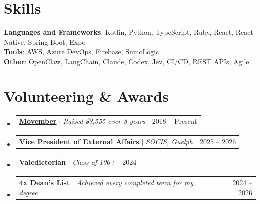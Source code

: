 \documentclass[letterpaper,11pt]{article}
\makeatletter
\newcommand{\resumeProjectHeading}[2]{
    \item
    \begin{tabular*}{0.97\textwidth}{l@{\extracolsep{\fill}}r}
      \small#1 & #2 \\
    \end{tabular*}\vspace{-7pt}
}
\newcommand{\resumeSubHeadingListStart}{\begin{itemize}[leftmargin=0.15in, label={}]}
\newcommand{\resumeSubHeadingListEnd}{\end{itemize}}
\makeatother
\begin{document}
%
\section{Skills}
 \begin{itemize}[leftmargin=0.15in, label={}]
    \small{\item{
     \textbf{Languages and Frameworks}{: Kotlin, Python, TypeScript, Ruby, React, React Native, Spring Boot, Expo}
      \\
     \textbf{Tools}{: AWS, Azure DevOps, Firebase, SumoLogic}
     \\
     \textbf{Other}{: OpenClaw, LangChain, Claude, Codex, Jev, CI/CD, REST APIs, Agile}}}
 \end{itemize}


\section{Volunteering \& Awards}
    \resumeSubHeadingListStart
    \resumeProjectHeading
          {\textbf{\href{https://movember.com/m/adam-montgomery?mc=1}{Movember}} $|$ \emph{Raised \$3,555 over 8 years }}{2018 -- Present}
      \resumeProjectHeading
          {\textbf{Vice President of External Affairs} $|$ \emph{SOCIS, Guelph}}{2025 -- 2026}
      \resumeProjectHeading
          {\textbf{Valedictorian} $|$ \emph{Class of 100+}}{2024}
      \resumeProjectHeading
          {\textbf{4x Dean's List} $|$ \emph{Achieved every completed term for my degree}}{2024 -- 2026}
    \resumeSubHeadingListEnd

\end{document}
